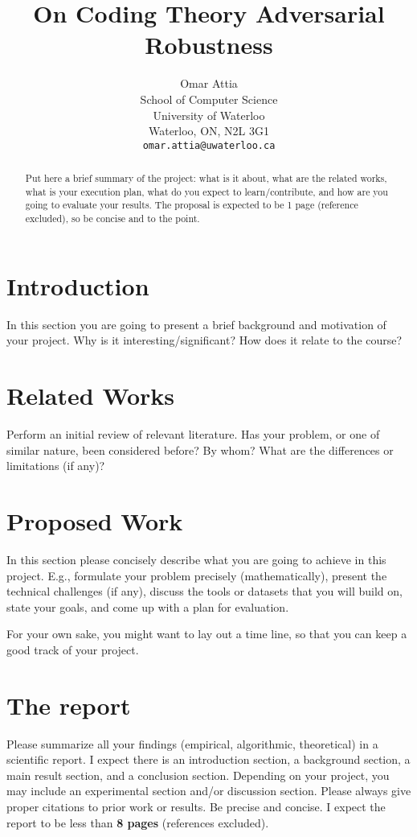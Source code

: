 \documentclass{article}
\title{On Coding Theory Adversarial Robustness}
\author{
	Omar Attia \\
	School of Computer Science\\
	University of Waterloo\\
	Waterloo, ON, N2L 3G1 \\
	\texttt{omar.attia@uwaterloo.ca}
}
\begin{document}
\maketitle

\begin{abstract} 
Put here a brief summary of the project: what is it about, what are the related works, what is your execution plan, what do you expect to learn/contribute, and how are you going to evaluate your results. The proposal is expected to be 1 page (reference excluded), so be concise and to the point.
\end{abstract} 

\section{Introduction}
In this section you are going to present a brief background and motivation of your project. Why is it interesting/significant? How does it relate to the course?

\section{Related Works}
Perform an initial review of relevant literature. Has your problem, or one of similar nature, been considered before? By whom? What are the differences or limitations (if any)? 

\section{Proposed Work}
In this section please concisely describe what you are going to achieve in this project. E.g., formulate your problem precisely (mathematically), present the technical challenges (if any), discuss the tools or datasets that you will build on, state your goals, and come up with a plan for evaluation.

For your own sake, you might want to lay out a time line, so that you can keep a good track of your project.

\newpage

\section*{The report}
Please summarize all your findings (empirical, algorithmic, theoretical) in a scientific report. I expect there is an introduction section, a background section, a main result section, and a conclusion section. Depending on your project, you may include an experimental section and/or discussion section. Please always give proper citations to prior work or results. Be precise and concise. I expect the report to be less than \textbf{8 pages} (references excluded).
\end{document}
